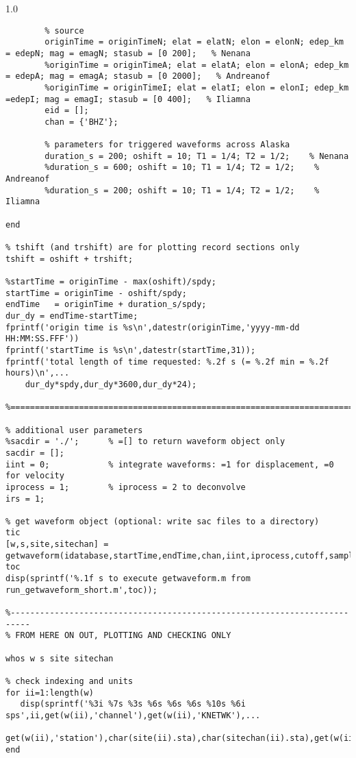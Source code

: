 \documentclass[11pt,titlepage,fleqn]{article}
\begin{document}
\begin{spacing}{1.0}
\begin{verbatim}
        % source
        originTime = originTimeN; elat = elatN; elon = elonN; edep_km = edepN; mag = emagN; stasub = [0 200];   % Nenana
        %originTime = originTimeA; elat = elatA; elon = elonA; edep_km = edepA; mag = emagA; stasub = [0 2000];   % Andreanof
        %originTime = originTimeI; elat = elatI; elon = elonI; edep_km =edepI; mag = emagI; stasub = [0 400];   % Iliamna
        eid = [];
        chan = {'BHZ'};

        % parameters for triggered waveforms across Alaska
        duration_s = 200; oshift = 10; T1 = 1/4; T2 = 1/2;    % Nenana
        %duration_s = 600; oshift = 10; T1 = 1/4; T2 = 1/2;    % Andreanof
        %duration_s = 200; oshift = 10; T1 = 1/4; T2 = 1/2;    % Iliamna
        
end

% tshift (and trshift) are for plotting record sections only
tshift = oshift + trshift;

%startTime = originTime - max(oshift)/spdy;
startTime = originTime - oshift/spdy;
endTime   = originTime + duration_s/spdy;
dur_dy = endTime-startTime;
fprintf('origin time is %s\n',datestr(originTime,'yyyy-mm-dd HH:MM:SS.FFF'))
fprintf('startTime is %s\n',datestr(startTime,31));
fprintf('total length of time requested: %.2f s (= %.2f min = %.2f hours)\n',...
    dur_dy*spdy,dur_dy*3600,dur_dy*24);

%==========================================================================

% additional user parameters
%sacdir = './';      % =[] to return waveform object only
sacdir = [];
iint = 0;            % integrate waveforms: =1 for displacement, =0 for velocity
iprocess = 1;        % iprocess = 2 to deconvolve
irs = 1;

% get waveform object (optional: write sac files to a directory)
tic
[w,s,site,sitechan] = getwaveform(idatabase,startTime,endTime,chan,iint,iprocess,cutoff,samplerate,stasub,sacdir,originTime,elat,elon,edep_km,mag,eid);
toc
disp(sprintf('%.1f s to execute getwaveform.m from run_getwaveform_short.m',toc));

%--------------------------------------------------------------------------
% FROM HERE ON OUT, PLOTTING AND CHECKING ONLY

whos w s site sitechan

% check indexing and units
for ii=1:length(w)
   disp(sprintf('%3i %7s %3s %6s %6s %6s %10s %6i sps',ii,get(w(ii),'channel'),get(w(ii),'KNETWK'),...
       get(w(ii),'station'),char(site(ii).sta),char(sitechan(ii).sta),get(w(ii),'units'),get(w(ii),'freq')));
end


\end{verbatim}
\end{spacing}
\end{document}
